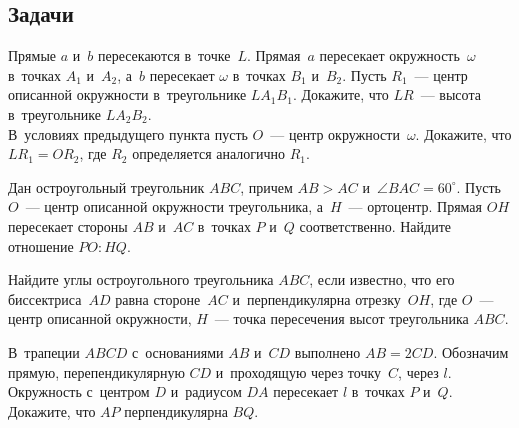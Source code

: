 \subsection*{Задачи}

\begin{problems}

\item
\subproblem
Прямые $a$ и~$b$ пересекаются в~точке~$L$.
Прямая~$a$ пересекает окружность~$\omega$ в~точках $A_1$ и~$A_2$,
а~$b$ пересекает $\omega$ в~точках $B_1$ и~$B_2$.
Пусть $R_1$~--- центр описанной окружности в~треугольнике $L A_1 B_1$.
Докажите, что $LR$~--- высота в~треугольнике $L A_2 B_2$.
\\
\subproblem
В~условиях предыдущего пункта пусть $O$~--- центр окружности~$\omega$.
Докажите, что $L R_1 = O R_2$, где $R_2$ определяется аналогично $R_1$.

\item
Дан остроугольный треугольник $ABC$, причем $AB > AC$
и~$\angle BAC = 60^{\circ}$.
Пусть $O$~--- центр описанной окружности треугольника, а~$H$~--- ортоцентр.
Прямая $OH$ пересекает стороны $AB$ и~$AC$ в~точках $P$ и~$Q$ соответственно.
Найдите отношение $PO : HQ$.

\item
Найдите углы остроугольного треугольника $ABC$, если известно, что его
биссектриса~$AD$ равна стороне~$AC$ и~перпендикулярна отрезку~$OH$, где $O$~---
центр описанной окружности, $H$~--- точка пересечения высот треугольника $ABC$.

\item
В~трапеции $ABCD$ с~основаниями $AB$ и~$CD$ выполнено $AB = 2 CD$.
Обозначим прямую, перепендикулярную $CD$ и~проходящую через точку~$C$, через
$l$.
Окружность с~центром $D$ и~радиусом $DA$ пересекает $l$ в~точках $P$ и~$Q$.
Докажите, что $AP$ перпендикулярна $BQ$.

\end{problems}

\endgroup %

